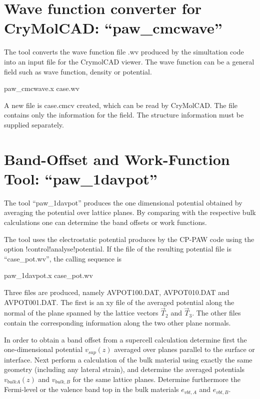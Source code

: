 \documentclass[final,12pt]{article}
\begin{document}
{{{{{{%
\newpage
\section{Wave function converter for CryMolCAD: ``paw\_cmcwave''}
The tool converts the wave function file .wv produced by the
simultation code into an input file for the CrymolCAD viewer. The wave
function can be a general field such as wave function, density or
potential.
\begin{center}
paw\_cmcwave.x case.wv
\end{center}
A new file is case.cmcv created, which can be read by CryMolCAD. The
file contains only the information for the field. The structure
information must be supplied separately.


\newpage
\section{Band-Offset and Work-Function Tool: ``paw\_1davpot''}
The tool ``paw\_1davpot'' produces the one dimensional potential
obtained by averaging the potential over lattice planes. By comparing
with the respective bulk calculations one can determine the band
offsets or work functions.

The tool uses the electrostatic potential produces by the CP-PAW code
using the option !control!analyse!potential. If the file of the
resulting potential file is ``case\_pot.wv'',  the calling sequence is
\begin{center}
paw\_1davpot.x case\_pot.wv
\end{center}
Three files are produced, namely AVPOT100.DAT, AVPOT010.DAT and
AVPOT001.DAT. The first is an xy file of the averaged potential along
the normal of the plane spanned by the lattice vectors $\vec{T}_2$ and
$\vec{T}_3$. The other files contain the corresponding information
along the two other plane normals.

In order to obtain a band offset from a supercell calculation
determine first the one-dimensional potential $v_{sup}(z)$ averaged
over planes parallel to the surface or interface. Next perform a
calculation of the bulk material using exactly the same geometry
(including any lateral strain), and determine the averaged potentials
$v_{bulk A}(z)$ and $v_{bulk,B}$ for the same lattice planes.
Determine furthermore the Fermi-level or the valence band top in the bulk
materials $e_{vbt,A}$ and $e_{vbt,B}$.

}}}}}}
\end{document}
